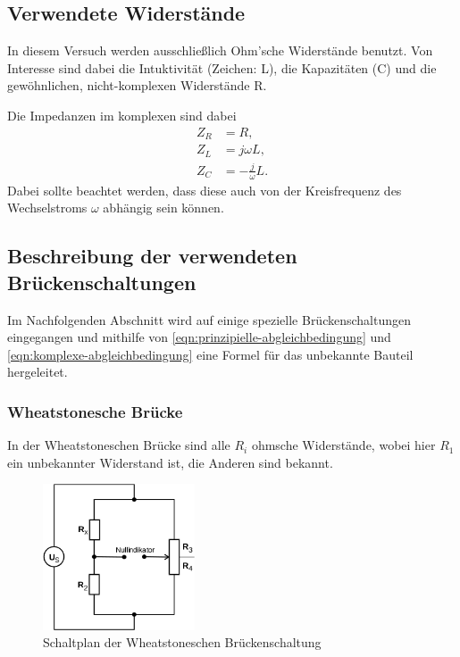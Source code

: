\subsection{Verwendete Widerstände}
\label{seq:widerstände}
In diesem Versuch werden ausschließlich Ohm'sche Widerstände benutzt. Von Interesse sind dabei
die Intuktivität (Zeichen: L), die Kapazitäten (C) und die gewöhnlichen, nicht-komplexen 
Widerstände R.

Die Impedanzen im komplexen sind dabei
\begin{align}
	Z_R &= R, \\
	Z_L &= j\omega L, \\
	Z_C &= -\frac{j}{\omega} L.
	\label{eqn:impedanzen}
\end{align}
Dabei sollte beachtet werden, dass diese auch von der Kreisfrequenz des Wechselstroms $\omega$ 
abhängig sein können. 

\subsection{Beschreibung der verwendeten Brückenschaltungen}
\label{sec:spezielle-Schaltungen}

Im Nachfolgenden Abschnitt wird auf einige spezielle Brückenschaltungen eingegangen und mithilfe von
\autoref{eqn:prinzipielle-abgleichbedingung} und \autoref{eqn:komplexe-abgleichbedingung} 
eine Formel für das unbekannte Bauteil hergeleitet.

\subsubsection{Wheatstonesche Brücke}
\label{sec:theorie-wheatstone}
In der Wheatstoneschen Brücke sind alle $R_i$ ohmsche Widerstände, wobei hier $R_1$ ein unbekannter
Widerstand ist, die Anderen sind bekannt.

\begin{figure}[H]
	\centering
	\includegraphics[width=0.4\textwidth]{bilder/wheatstone.png}
	\caption{Schaltplan der Wheatstoneschen Brückenschaltung}
	\label{fig:wheatstone-bruecke}
\end{figure}

